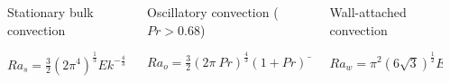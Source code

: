 \begin{columns}[T]
	\begin{column}{0.02\textwidth}
	\end{column}
  \begin{column}{0.30\textwidth}
	  Stationary bulk convection \cite{chandrasekhar1981hydrodynamic}
	\hfill \break

  $Ra_{s} = \frac{3}{2} \left( 2 \pi^4 \right)^{\frac{1}{3}} {Ek}^{- \frac{4}{3}}$
  \end{column}
  \begin{column}{0.38\textwidth}
  Oscillatory convection (${Pr} > 0.68$) \cite{Horn2017}
  \hfill \break

  $Ra_{o} = \frac{3}{2} \left( 2 \pi \: {Pr} \right)^{\frac{4}{3}} \left(1 + {Pr} \right)^{- \frac{1}{3}} {Ek}^{-\frac{4}{3}}$
  \end{column}
  \begin{column}{0.30\textwidth}
  Wall-attached convection \cite{Herrmann1993}
  \hfill \break

  ${Ra_{w}} = \pi^{2} \left(6 \sqrt{3} \right)^{\frac{1}{2}} {Ek}^{-1}$
  \end{column}
\end{columns}
\hfill \break
